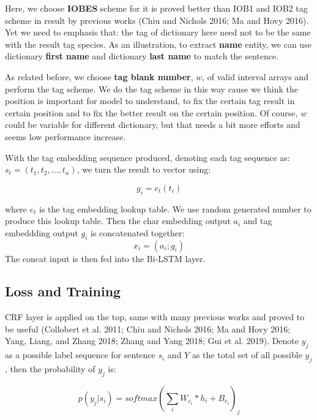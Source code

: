 \documentclass[letterpaper]{article} %
\begin{document}
Here, we choose \textbf{IOBES} scheme for it is proved better than IOB1 and IOB2 tag scheme in result by previous works (Chiu and Nichols 2016; Ma and Hovy 2016). Yet we need to emphasis that: the tag of dictionary here need not to be the same with the result tag species. As an illustration, to extract \textbf{name} entity, we can use dictionary \textbf{first name} and dictionary \textbf{last name} to match the sentence.

As related before, we choose \textbf{tag blank number}, $w$, of valid interval arrays and perform the tag scheme. We do the tag scheme in this way cause we think the position is important for model to understand, to fix the certain tag result in certain position and to fix the better result on the certain position. Of course, $w$ could be variable for different dictionary, but that needs a bit more efforts and seems low performance increase.

With the tag embedding sequence produced, denoting each tag sequence as: $s_t = (t_1, t_2, ..., t_n)$, we turn the result to vector using: 

\begin{equation}
g_i = e_t(t_i) \label{tag_embedding}
\end{equation}

where $e_t$ is the tag embedding lookup table. We use random generated number to produce this lookup table. Then the char embedding output $a_i$ and tag embeddding output $g_i$ is concatenated together:
\begin{equation}
x_i = (a_i;g_i) \label{concat}
\end{equation}
The concat input is then fed into the Bi-LSTM layer.  

\subsection{Loss and Training}

CRF layer is applied on the top, same with many previous works and proved to be useful (Collobert et al. 2011; Chiu and Nichols 2016; Ma and Hovy 2016; Yang, Liang, and Zhang 2018; Zhang and Yang 2018; Gui et al. 2019). Denote $y_j$ as a possible label sequence for sentence $s_i$ and $Y$ as the total set of all possible $y_j$, then the probability of $y_j$ is:

\begin{equation}
p(y_j | s_i) = softmax(\sum_i{W_{c_i} * h_i} + B_{c_i})_j
\label{crf_probability}
\end{equation}
\end{document}
